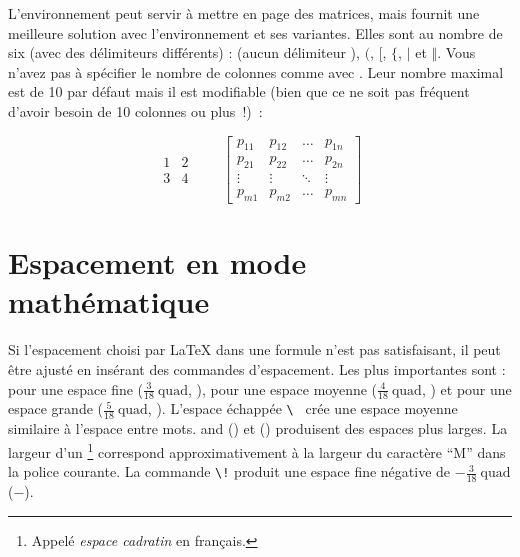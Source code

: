 L'environnement  peut servir à mettre en page des
matrices, mais  fournit une meilleure
solution avec l'environnement  et ses variantes. Elles sont au
nombre de six (avec des délimiteurs différents) :  (aucun
délimiteur ), 
$($,  $[$,  $\{$,  $\vert$ et
 $\Vert$. Vous n'avez pas à spécifier le nombre de
colonnes comme avec . Leur nombre maximal est de 10 par défaut mais il
est modifiable (bien que ce ne soit pas fréquent d'avoir besoin de 10
colonnes ou plus~!)~:
\begin{example}
\begin{equation*}
  \begin{matrix} 
    1 & 2 \\
    3 & 4 
  \end{matrix} \qquad
  \begin{bmatrix} 
    p_{11} & p_{12} & \ldots 
    & p_{1n} \\
    p_{21} & p_{22} & \ldots 
    & p_{2n} \\
    \vdots & \vdots & \ddots 
    & \vdots \\
    p_{m1} & p_{m2} & \ldots 
    & p_{mn} 
  \end{bmatrix}
\end{equation*}
\end{example}

\section{Espacement en mode mathématique}
\label{sec:math-spacing}


Si l'espacement choisi par \LaTeX{} dans une formule n'est pas
satisfaisant, il peut être ajusté en insérant des commandes
d'espacement. Les plus importantes sont : \ci{,} pour une espace fine
($\frac{3}{18}\:\textrm{quad}$, \demowidth{0.166em}), \ci{:} pour une
espace moyenne ($\frac{4}{18}\:\textrm{quad}$, \demowidth{0.222em}) et
\ci{;} pour une espace grande ($\frac{5}{18}\: \textrm{quad}$,
\demowidth{0.277em}).  L'espace échappée \verb*|\ | crée une espace
moyenne similaire à l'espace entre mots. and 
(\demowidth{1em}) et  (\demowidth{2em}) produisent des
espaces plus larges.  La largeur d'un \footnote{Appelé \emph{espace
    cadratin} en français. \NdT} correspond approximativement à la largeur du
caractère \enquote{M} dans la police courante. 
La commande \verb|\!| produit une espace fine négative
de $-\frac{3}{18}\:\textrm{quad}$ ($-$\demowidth{0.166em}).

